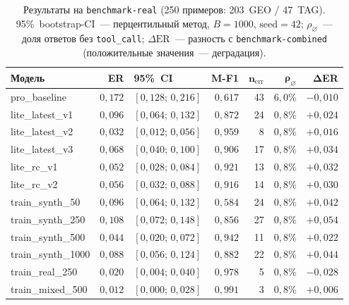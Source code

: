 \begin{table}[H]
\centering
\caption{Результаты на \texttt{benchmark-real} (250 примеров: 203~GEO / 47~TAG). 95\%~bootstrap-CI~--- перцентильный метод, $B = 1000$, $\mathrm{seed} = 42$; $\rho_\varnothing$~--- доля ответов без \texttt{tool\_call}; $\Delta\mathrm{ER}$~--- разность с \texttt{benchmark-combined} (положительные значения~--- деградация).}
\label{tab:real_results}
\def\arraystretch{1.15}
\setlength\tabcolsep{0.25em}
{\small
\begin{tabular}{l r l r r r r}
    \toprule
    \textbf{Модель} & \textbf{ER} & \textbf{95\%~CI} & \textbf{M-F1} & $\boldsymbol{n_\mathrm{err}}$ & $\boldsymbol{\rho_\varnothing}$ & $\boldsymbol{\Delta}$\textbf{ER} \\
    \midrule
    pro\_baseline       & $0{,}172$ & $[0{,}128;\,0{,}216]$ & $0{,}617$ & 43 & $6{,}0\%$ & $-0{,}010$ \\
    \midrule
    lite\_latest\_v1    & $0{,}096$ & $[0{,}064;\,0{,}132]$ & $0{,}872$ & 24 & $0{,}8\%$ & $+0{,}024$ \\
    lite\_latest\_v2    & $0{,}032$ & $[0{,}012;\,0{,}056]$ & $0{,}959$ &  8 & $0{,}8\%$ & $+0{,}016$ \\
    lite\_latest\_v3    & $0{,}068$ & $[0{,}040;\,0{,}100]$ & $0{,}906$ & 17 & $0{,}8\%$ & $+0{,}034$ \\
    \midrule
    lite\_rc\_v1        & $0{,}052$ & $[0{,}028;\,0{,}084]$ & $0{,}921$ & 13 & $0{,}8\%$ & $+0{,}032$ \\
    lite\_rc\_v2        & $0{,}056$ & $[0{,}032;\,0{,}088]$ & $0{,}916$ & 14 & $0{,}8\%$ & $+0{,}030$ \\
    \midrule
    train\_synth\_50    & $0{,}096$ & $[0{,}064;\,0{,}132]$ & $0{,}584$ & 24 & $0{,}8\%$ & $+0{,}042$ \\
    train\_synth\_250   & $0{,}108$ & $[0{,}072;\,0{,}148]$ & $0{,}856$ & 27 & $0{,}8\%$ & $+0{,}054$ \\
    train\_synth\_500   & $0{,}044$ & $[0{,}020;\,0{,}072]$ & $0{,}942$ & 11 & $0{,}8\%$ & $+0{,}022$ \\
    train\_synth\_1000  & $0{,}088$ & $[0{,}056;\,0{,}124]$ & $0{,}882$ & 22 & $0{,}8\%$ & $+0{,}044$ \\
    \midrule
    train\_real\_250    & $0{,}020$ & $[0{,}004;\,0{,}040]$ & $0{,}978$ &  5 & $0{,}8\%$ & $-0{,}028$ \\
    train\_mixed\_500   & $0{,}012$ & $[0{,}000;\,0{,}028]$ & $0{,}991$ &  3 & $0{,}8\%$ & $+0{,}006$ \\
    \bottomrule
\end{tabular}
}
\end{table}

